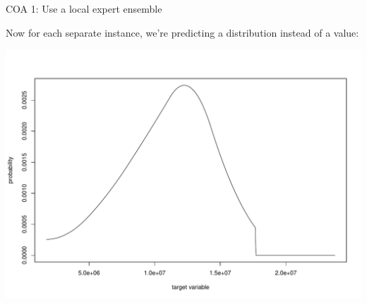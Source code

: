 \documentclass[ignorenonframetext,]{beamer}
\newenvironment{Shaded}{\begin{snugshade}}{\end{snugshade}}
\newcommand{\KeywordTok}[1]{\textcolor[rgb]{0.13,0.29,0.53}{\textbf{{#1}}}}
\newcommand{\DataTypeTok}[1]{\textcolor[rgb]{0.13,0.29,0.53}{{#1}}}
\newcommand{\DecValTok}[1]{\textcolor[rgb]{0.00,0.00,0.81}{{#1}}}
\newcommand{\OtherTok}[1]{\textcolor[rgb]{0.56,0.35,0.01}{{#1}}}
\newcommand{\NormalTok}[1]{{#1}}
\begin{document}
\begin{frame}[fragile]{COA 1: Use a local expert ensemble}

Now for each separate instance, we're predicting a distribution instead
of a value:

\footnotesize

\begin{Shaded}
\end{Shaded}

\includegraphics{presentation_files/figure-beamer/unnamed-chunk-16-1.pdf}


\end{frame}
\end{document}
